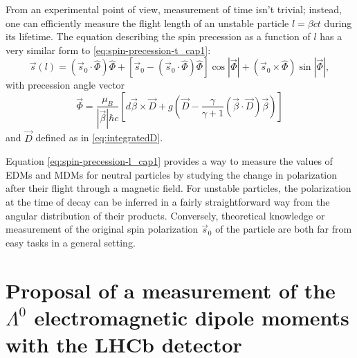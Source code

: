 From an experimental point of view, measurement of time isn't trivial;
instead, one can efficiently measure the flight length of an unstable particle $l=\beta c t$ during its lifetime.
The equation describing the spin precession as a function of $l$ has a very similar form to \eqref{eq:spin-precession-t_cap1}:
\begin{equation}
	\vec{s} \left(
		l
	\right) =
	\left(
		\vec{s}_0 \cdot \hat{\Phi}
	\right) \hat{\Phi}
	+
	\left[
		\vec{s}_0 - \left(
			\vec{s}_0 \cdot \hat{\Phi}
		\right) \hat{\Phi}
	\right]
	\cos \left \lvert
		\vec{\Phi}
	\right\rvert
	+
	\left(
		\vec{s}_0 \times \hat{\Phi}
	\right)
	\sin \left \lvert
		\vec{\Phi}
	\right \rvert,
\label{eq:spin-precession-l_cap1}
\end{equation}
with precession angle vector
\begin{equation}
\vec{\Phi} = \frac{\mu_B}{|\vec{\beta}|\hbar c}
\left[
	d\vec{\beta} \times \vec{D}
	+
	g\left(
	\vec{D} - \frac{\gamma}{\gamma+1}(\vec{\beta} \cdot \vec{D}) \vec{\beta}
	\right)
\right]
\end{equation}
and $\vec{D}$ defined as in \eqref{eq:integratedD}.

Equation \eqref{eq:spin-precession-l_cap1} provides a way to measure the values of EDMs and MDMs for neutral particles by studying the change in polarization after their flight through a magnetic field.
For unstable particles, the polarization at the time of decay can be inferred in a fairly straightforward way from the angular distribution of their products.
Conversely, theoretical knowledge or measurement of the original spin polarization $\vec{s}_0$ of the particle are both far from easy tasks in a general setting.

\section{Proposal of a measurement of the \texorpdfstring{$\Lambda^0$}{Lambda} electromagnetic dipole moments with the LHCb detector}
\label{sec:lambda}


